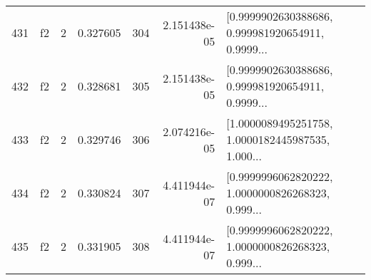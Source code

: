 \begin{tabular}{lllrlrl}
431 &  f2 &   2 &  0.327605 &  304 &  2.151438e-05 &  [0.9999902630388686, 0.999981920654911, 0.9999... \\
432 &  f2 &   2 &  0.328681 &  305 &  2.151438e-05 &  [0.9999902630388686, 0.999981920654911, 0.9999... \\
433 &  f2 &   2 &  0.329746 &  306 &  2.074216e-05 &  [1.0000089495251758, 1.0000182445987535, 1.000... \\
434 &  f2 &   2 &  0.330824 &  307 &  4.411944e-07 &  [0.9999996062820222, 1.0000000826268323, 0.999... \\
435 &  f2 &   2 &  0.331905 &  308 &  4.411944e-07 &  [0.9999996062820222, 1.0000000826268323, 0.999... \\
\bottomrule
\end{tabular}
